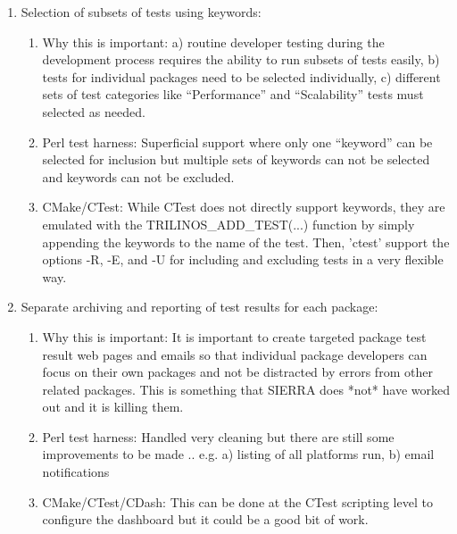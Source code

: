 \documentclass[pdf,ps2pdf,11pt]{SANDreport}
\begin{document}
\begin{enumerate}

{}\item Selection of subsets of tests using keywords:

  \begin{enumerate}

  {}\item Why this is important: a) routine developer testing during
  the development process requires the ability to run subsets of tests
  easily, b) tests for individual packages need to be selected
  individually, c) different sets of test categories like
  ``Performance'' and ``Scalability'' tests must selected as needed.

  {}\item Perl test harness: Superficial support where only one
  ``keyword'' can be selected for inclusion but multiple sets of
  keywords can not be selected and keywords can not be excluded.

  {}\item CMake/CTest: While CTest does not directly support keywords,
  they are emulated with the TRILINOS\_ADD\_TEST(...) function by
  simply appending the keywords to the name of the test.  Then,
  'ctest' support the options -R, -E, and -U for including and
  excluding tests in a very flexible way.

  \end{enumerate}

{}\item Separate archiving and reporting of test results for each
package:

  \begin{enumerate}

  {}\item Why this is important: It is important to create targeted
  package test result web pages and emails so that individual
  package developers can focus on their own packages and not be
  distracted by errors from other related packages.  This is
  something that SIERRA does *not* have worked out and it is killing
  them.

  {}\item Perl test harness: Handled very cleaning but there are
  still some improvements to be made .. e.g. a) listing of all
  platforms run, b) email notifications

  {}\item CMake/CTest/CDash: This can be done at the CTest scripting
  level to configure the dashboard but it could be a good bit of work.


\end{enumerate}
\end{enumerate}
\end{document}
